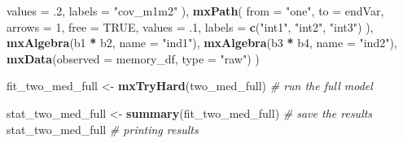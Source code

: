 \documentclass[11pt,]{article}
\newenvironment{Shaded}{\begin{snugshade}}{\end{snugshade}}
\newcommand{\CommentTok}[1]{\textcolor[rgb]{0.56,0.35,0.01}{\textit{#1}}}
\newcommand{\DataTypeTok}[1]{\textcolor[rgb]{0.13,0.29,0.53}{#1}}
\newcommand{\DecValTok}[1]{\textcolor[rgb]{0.00,0.00,0.81}{#1}}
\newcommand{\FloatTok}[1]{\textcolor[rgb]{0.00,0.00,0.81}{#1}}
\newcommand{\KeywordTok}[1]{\textcolor[rgb]{0.13,0.29,0.53}{\textbf{#1}}}
\newcommand{\NormalTok}[1]{#1}
\newcommand{\OperatorTok}[1]{\textcolor[rgb]{0.81,0.36,0.00}{\textbf{#1}}}
\newcommand{\OtherTok}[1]{\textcolor[rgb]{0.56,0.35,0.01}{#1}}
\newcommand{\StringTok}[1]{\textcolor[rgb]{0.31,0.60,0.02}{#1}}
\begin{document}
\begin{Shaded}
\begin{Highlighting}[]
    \DataTypeTok{values =} \FloatTok{.2}\NormalTok{,}
    \DataTypeTok{labels =} \StringTok{"cov_m1m2"}
\NormalTok{  ),}
  \KeywordTok{mxPath}\NormalTok{(}
    \DataTypeTok{from =} \StringTok{"one"}\NormalTok{,}
    \DataTypeTok{to =}\NormalTok{ endVar,}
    \DataTypeTok{arrows =} \DecValTok{1}\NormalTok{,}
    \DataTypeTok{free =} \OtherTok{TRUE}\NormalTok{,}
    \DataTypeTok{values =} \FloatTok{.1}\NormalTok{,}
    \DataTypeTok{labels =} \KeywordTok{c}\NormalTok{(}\StringTok{"int1"}\NormalTok{, }\StringTok{"int2"}\NormalTok{, }\StringTok{"int3"}\NormalTok{)}
\NormalTok{  ),}
  \KeywordTok{mxAlgebra}\NormalTok{(b1 }\OperatorTok{*}\StringTok{ }\NormalTok{b2, }\DataTypeTok{name =} \StringTok{"ind1"}\NormalTok{),}
  \KeywordTok{mxAlgebra}\NormalTok{(b3 }\OperatorTok{*}\StringTok{ }\NormalTok{b4, }\DataTypeTok{name =} \StringTok{"ind2"}\NormalTok{),}
  \KeywordTok{mxData}\NormalTok{(}\DataTypeTok{observed =}\NormalTok{ memory_df, }\DataTypeTok{type =} \StringTok{"raw"}\NormalTok{)}
\NormalTok{)}

\NormalTok{fit_two_med_full <-}\StringTok{ }\KeywordTok{mxTryHard}\NormalTok{(two_med_full) }\CommentTok{# run the full model}
\end{Highlighting}
\end{Shaded}

\begin{Shaded}
\begin{Highlighting}[]
\NormalTok{stat_two_med_full <-}\StringTok{ }\KeywordTok{summary}\NormalTok{(fit_two_med_full) }\CommentTok{# save the results}
\NormalTok{stat_two_med_full }\CommentTok{# printing results}
\end{Highlighting}
\end{Shaded}
\end{document}
